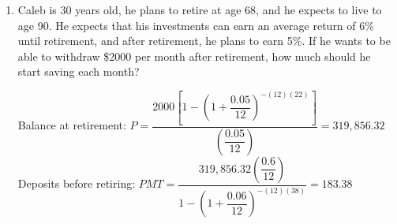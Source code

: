 \begin{enumerate}
\item Caleb is 30 years old, he plans to retire at age 68, and he expects to live to age 90.  He expects that his investments can earn an average return of 6\% until retirement, and after retirement, he plans to earn 5\%.  If he wants to be able to withdraw \$2000 per month after retirement, how much should he start saving each month? 
\begin{center}
Balance at retirement: $P = \dfrac{2000\left[1-\left(1+\dfrac{0.05}{12}\right)^{-(12)(22)}\right]}{\left(\dfrac{0.05}{12}\right)} = 319,856.32$\\
Deposits before retiring: $PMT = \dfrac{319,856.32\left(\dfrac{0.6}{12}\right)}{1-\left(1+\dfrac{0.06}{12}\right)^{-(12)(38)}} = 183.38$
\end{center}
\end{enumerate}
